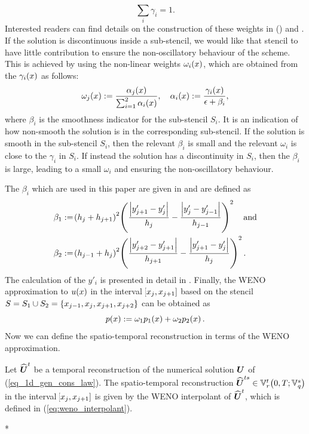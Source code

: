 \documentclass[final]{amsart}
\renewcommand{\vect}[1]{\geovec{#1}}
\renewcommand{\vec}[1]{\geovec{#1}}
\numberwithin{equation}{section}
\begin{document}
\begin{equation}
\sum_i \gamma_i = 1.
\end{equation}
Interested readers can find details on the construction of these weights in (\cite{carlini2005weighted}) and \cite{liu2009positivity}.  If the solution is discontinuous inside a sub-stencil, we would like that stencil to have little contribution to ensure the non-oscillatory behaviour of the scheme.  This is achieved by using the non-linear weights $\omega_i\!\left({x}\right)$, which are obtained from the $\gamma_i\!\left({x}\right)$ as follows:
\begin{equation}
\omega_j\!\left({x}\right):=\frac{\alpha_j\!\left({x}\right)}{\sum_{i=1}^2\alpha_i\!\left({x}\right)},\quad \alpha_i\!\left({x}\right):=\frac{\gamma_i\!\left({x}\right)}{\epsilon +\beta_i},
\end{equation}
where  $\beta_i$ is the {smoothness indicator} for the sub-stencil $S_i$.  It is an indication of how non-smooth the solution is in the corresponding sub-stencil.  If the solution is smooth in the sub-stencil $S_i$, then the relevant $\beta_i$ is small and the relevant $\omega_i$ is close to the $\gamma_i$ in $S_i$. If instead the solution has a discontinuity in $S_i$, then the $\beta_i$ is large, leading to a small $\omega_i$ and ensuring the non-oscillatory behaviour.

The $\beta_i$ which are used in this paper are given in \cite{janett2019novel} and are defined as
\begin{equation}
\begin{aligned}
\beta_1&:= \!\left({h_j +h_{j+1}}\right)^2\!\left({\frac{\left|y'_{j+1}-y'_j\right|}{h_j}  - \frac{\left|y'_{j}-y'_{j-1}\right|}{h_{j-1}}}\right)^2\quad \text{and}\\
\beta_2&:= \!\left({h_{j-1}+h_{j}}\right)^2\!\left({\frac{\left|y'_{j+2}-y'_{j+1}\right|}{h_{j+1}}  - \frac{\left|y'_{j+1}-y'_{j}\right|}{h_{j}}}\right)^2.
\end{aligned}
\end{equation}
The calculation of the $y'_i$ is presented in detail in \cite[\S3.3.2]{janett2019novel}.  Finally, the WENO approximation to $u\!\left({x}\right)$ in the interval $\!\left[{x_j, x_{j+1}}\right]$ based on the stencil $S=S_1\cup S_2=\left\lbrace x_{j-1}, x_j, x_{j+1}, x_{j+2}\right\rbrace$ can be obtained as
\begin{equation}\label{eq:weno_interpolant}
p\!\left({x}\right) := \omega_1p_1\!\left({x}\right) + \omega_2p_2\!\left({x}\right).
\end{equation}
   Now we can define the spatio-temporal reconstruction in terms of the WENO approximation.


\begin{Defn}\label{defn_spatio-temporal reconstruction}
	Let $ \widehat{\vec{U}}^t$ be a temporal reconstruction of the numerical solution $\vect{U}$ of (\ref{eq_1d_gen_cons_law}).  The spatio-temporal reconstruction $\widehat{\vec{U}}^{ts}\in\mathbb{V}^t_r\qp{0,T; \mathbb{V}^s_q}$ 
	in the interval $\!\left[{x_j, x_{j+1}}\right]$ is given by the WENO interpolant of $\widehat{\vec{U}}^t$, which is defined in (\ref{eq:weno_interpolant}).
\end{Defn}
\/*
\end{document}
